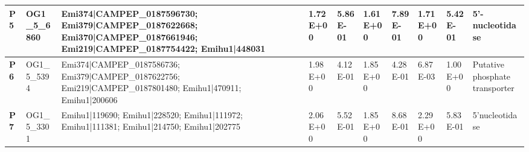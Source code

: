 \begin{landscape}
\begin{center}
\begin{footnotesize}
\begin{longtable}{|p{0.5cm}|p{1.5cm}|p{4cm}|l|l|l|l|l|l|l|}
\textbf{P5}  & OG1\_5\_6860  & Emi374|CAMPEP\_0187596730; Emi379|CAMPEP\_0187622668; Emi370|CAMPEP\_0187661946; Emi219|CAMPEP\_0187754422; Emihu1|448031                                                                                                                                                                                                                                                                                                                                                                                                                                                                                                                & 1.72E+00  & 5.86E-01 & 1.61E+00  & 7.89E-01 & 1.71E+00  & 5.42E-01 & 5'-nucleotidase                                                              \\ \hline
\textbf{P6}  & OG1\_5\_5394  & Emi374|CAMPEP\_0187586736; Emi379|CAMPEP\_0187622756; Emi219|CAMPEP\_0187801480; Emihu1|470911; Emihu1|200606                                                                                                                                                                                                                                                                                                                                                                                                                                                                                                                            & 1.98E+00  & 4.12E-01 & 1.85E+00  & 4.28E-01 & 6.87E-03  & 1.00E+00 & Putative phosphate transporter                                               \\ \hline
\textbf{P7}  & OG1\_5\_3301  & Emihu1|119690; Emihu1|228520; Emihu1|111972; Emihu1|111381; Emihu1|214750; Emihu1|202775                                                                                                                                                                                                                                                                                                                                                                                                                                                                                                                                                 & 2.06E+00  & 5.52E-01 & 1.85E+00  & 8.68E-01 & 2.29E+00  & 5.83E-01 & 5'nucleotidase                                                               \\ \hline

\end{longtable}
\end{footnotesize}
\end{center}
\end{landscape}
